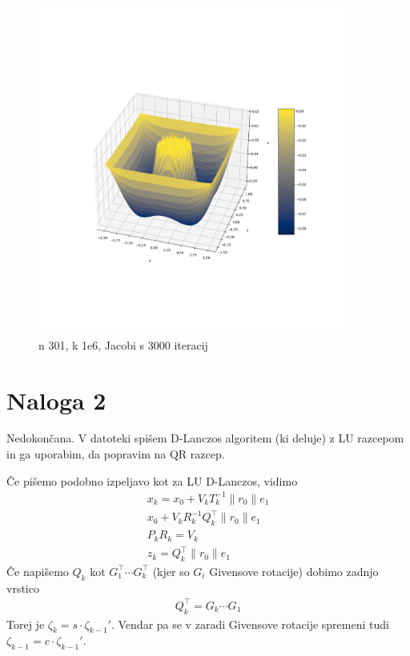 \documentclass{article}
\begin{document}
    \begin{figure}[h]
        \centering
        \includegraphics[width=0.9\textwidth]{nal1_n600_k100000.png}
        \caption{n 301, k 1e6, Jacobi s 3000 iteracij}
    \end{figure}

    
    \section{Naloga 2}
    Nedokončana. V datoteki spišem D-Lanczos algoritem (ki deluje) z LU razcepom in ga uporabim, da popravim na QR razcep. 

    Če pišemo podobno izpeljavo kot za LU D-Lanczos, vidimo
    \begin{align*}
        x_k = x_0 + V_kT_k^{-1}\lVert r_0\rVert e_1\\
        x_0 + V_k R_k^{-1} Q_k^\top \lVert r_0 \rVert e_1\\
        P_k R_k= V_k\\
        z_k = Q_k^\top \lVert r_0 \rVert e_1
    \end{align*}
    Če napišemo \(Q_k\) kot \(G_1^\top \cdots G_k^\top\) (kjer so \(G_i\) Givensove rotacije) dobimo zadnjo vrstico
    \begin{align*}
        Q_k^\top = G_k \cdots G_1
    \end{align*}
    Torej je \(\zeta_k = s\cdot \zeta_{k-1}'\). Vendar pa se v zaradi Givensove rotacije spremeni tudi \(\zeta_{k-1} = c\cdot \zeta_{k-1}'\).
\end{document}
